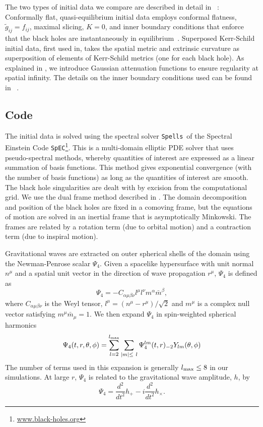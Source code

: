 The two types of initial data we compare are described in detail in
~\cite{Lovelace2008}: Conformally flat, quasi-equilibrium initial
data employs conformal flatness, $\tilde{g}_{ij}=f_{ij}$, maximal
slicing, $K=0$, and inner
boundary conditions that enforce that the black holes are
instantaneously in
equilibrium~.  Superposed
Kerr-Schild initial data, first used
in, takes the spatial
metric and extrinsic curvature as superposition of elements of
Kerr-Schild metrics (one for each black hole).  As explained in
\cite{Lovelace2008}, we introduce Gaussian attenuation functions
to ensure regularity at spatial infinity. The details on the inner
boundary conditions used can be found in ~\cite{Lovelace2008}.



\subsection{Code}
\label{sec:Code}

The initial data is solved using the spectral solver {\tt Spells}~ of the Spectral 
 Einstein Code {\tt SpEC}\footnote{\url{www.black-holes.org}}. This is a
multi-domain elliptic PDE solver that uses pseudo-spectral methods,
whereby quantities of interest are expressed as a linear summation of
basis functions. This method gives exponential convergence (with the
number of basis functions) as long as the quantities of interest are
smooth. The black hole singularities are dealt with by excision from
the computational grid. We use the dual frame method described in
\cite{Scheel2006}. The domain decomposition and position of the black
holes are fixed in a comoving frame, but the equations of motion are
solved in an inertial frame that is asymptotically Minkowski. The
frames are related by a rotation term (due to orbital motion) and a
contraction term (due to inspiral motion).

Gravitational waves are extracted on outer spherical shells of the
domain using the Newman-Penrose scalar $\Psi_4$. Given a spacelike
hypersurface with unit normal $n^{\mu}$ and a spatial unit vector in
the direction of wave propagation $r^{\mu}$, $\Psi_4$ is defined as 
\begin{equation}
\Psi_4 = -C_{\alpha\mu\beta\nu}l^{\mu}l^{\nu}m^{\alpha}\bar{m}^{\beta},
\end{equation}
where $C_{\alpha\mu\beta\nu}$ is the Weyl tensor,
$l^{\mu}=\left(n^{\mu}-r^{\mu}\right)/\sqrt{2}$ and $m^{\mu}$ is a
complex null vector satisfying $m^{\mu}\bar{m}_{\mu}=1$. We then expand
$\Psi_4$ in spin-weighted spherical harmonics
\begin{equation}
\Psi_4(t,r,\theta,\phi)=\sum_{l=2}^{l_{\rm max}}\sum_{|m|\leq~l}{\Psi_4^{lm}(t,r)_{-2}Y_{lm}(\theta,\phi)}
\end{equation}
The number of terms used in this expansion is generally $l_{\rm max}\leq 8$ in
our simulations. At large $r$, $\Psi_4$ is related to the
gravitational wave amplitude, $h$, by
\begin{equation}
\Psi_4=\frac{d^2}{dt^2}h_{+}-i\frac{d^2}{dt^2}h_{\times}.
\end{equation}


